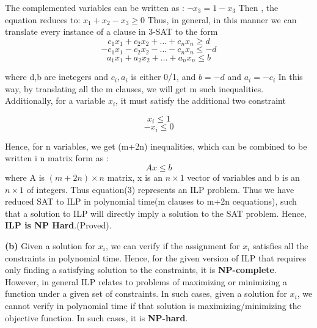 \documentclass{article}
\renewcommand\part[1]{\vspace{.10in}\textbf{(#1)}}
\begin{document}
The complemented variables can be written as :\newline
\hspace*{1cm} $\neg x_{3} = 1 - x_{3}$ \newline
Then , the equation reduces to: \newline
\hspace*{1cm} $x_{1} + x_{2} - x_{3} \geq 0$ \newline
Thus, in general, in this manner we can translate every instance of a clause in 3-SAT to the form \newline
  \[c_{1}x_{1} + c_{2}x_{2} + \dots + c_{n}x_{n} \geq d\]
  \[-c_{1}x_{1} - c_{2}x_{2} - \dots - c_{n}x_{n} \leq -d\]
  \[a_{1}x_{1} + a_{2}x_{2} + \dots + a_{n}x_{n} \leq b\]

where d,b are inetegers and $c_{i},a_{i}$ is either 0/1, and $b = -d$ and $a_{i} = -c_{i}$ \newline
In this way, by translating all the m clauses, we will get m such inequalities. Additionally, for a variable $x_{i}$, it must satisfy the additional two constraint 

\[x_{i} \leq 1\]
\[-x_{i} \leq 0\]

Hence, for n variables, we get (m+2n) inequalities, which can be combined to be written  i n matrix form as : \newline
\begin{equation}
   Ax \leq b
\end{equation}
where A is $(m+2n) \times n$ matrix, x is an $n \times 1$ vector of variables and b is an $n \times 1$ of integers. Thus equation(3) represents an ILP problem. \newline
Thus we have reduced SAT to ILP in polynomial time(m clauses to m+2n cequations), such that a solution to ILP will directly imply a solution to the SAT problem. Hence, \textbf {ILP is NP Hard}.(Proved). \newline

\part{b}
Given a solution for $x_{i}$, we can verify if the assignment for $x_{i}$ satisfies all the constraints in polynomial time. Hence, for the given version of ILP that requires only finding a satisfying solution to the constraints, it is \textbf {NP-complete}. However, in general ILP relates to problems of maximizing or minimizing a function under a given set of constraints. In such cases, given a solution for $x_{i}$, we cannot verify in polynomial time if that solution is maximizing/minimizing the objective function. In such cases, it is \textbf {NP-hard}. \newline
\end{document}
